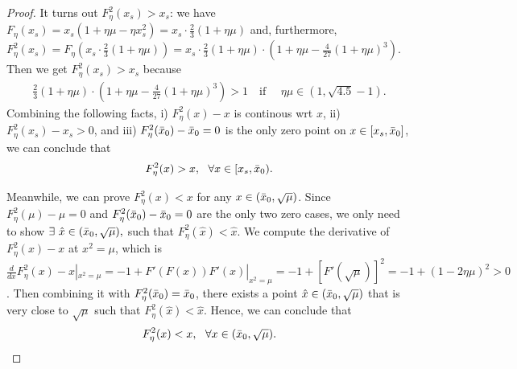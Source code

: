 \documentclass{article}
\theoremstyle{plain}
\theoremstyle{remark}
\begin{document}
\begin{proof}
It turns out $F_{\eta}^2(x_s)>x_s$: we have $F_{\eta}(x_s)=x_s(1+\eta\mu-\eta x_s^2) = x_s\cdot \frac{2}{3}(1+\eta\mu)$ and, furthermore, $F^2_\eta(x_s)=F_\eta(x_s\cdot \frac{2}{3}(1+\eta\mu))=x_s\cdot \frac{2}{3}(1+\eta\mu)\cdot\left(1+\eta\mu-\frac{4}{27}(1+\eta\mu)^3\right)$. Then we get $F^2_\eta(x_s)>x_s$ because
\begin{align}
    \frac{2}{3}(1+\eta\mu)\cdot\left(1+\eta\mu-\frac{4}{27}(1+\eta\mu)^3\right) > 1 \text{~~~if~~~~} \eta\mu\in(1,\sqrt{4.5}-1).
\end{align}
Combining the following facts, i) $F^2_\eta(x)-x$ is continous wrt $x$, ii) $F^2_\eta(x_s)-x_s>0$, and iii) $F^2_\eta(\Bar{x}_0)-\Bar{x}_0=0$ is the only zero point on $x\in[x_s, \Bar{x}_0]$, we can conclude that 
\begin{align}
    F^2_\eta(x)>x, ~~\forall x \in[x_s,\Bar{x}_0).
\end{align}

Meanwhile, we can prove $F^2_\eta(x)<x$ for any $x\in(\Bar{x}_0,\sqrt{\mu})$. Since $F^2_\eta(\mu)-\mu=0$ and $F^2_\eta(\Bar{x}_0)-\Bar{x}_0=0$ are the only two zero cases, we only need to show $\exists ~\hat{x}\in (\Bar{x}_0,\sqrt{\mu}),$ such that $F^2_\eta(\hat{x})<\hat{x}$. We compute the derivative of $F^2_\eta(x)-x$ at $x^2=\mu$, which is $\frac{d}{dx}F^2_\eta(x)-x|_{x^2=\mu}=-1+F'(F(x))F'(x)|_{x^2=\mu}=-1+[F'(\sqrt{\mu})]^2=-1+(1-2\eta\mu)^2>0$. Then combining it with $F^2_\eta(\Bar{x}_0)=\Bar{x}_0$, there exists a point $\hat{x}\in(\Bar{x}_0,\sqrt{\mu})$ that is very close to $\sqrt{\mu}$ such that $F^2_\eta(\hat{x})<\hat{x}$. Hence, we can conclude that 
\begin{align}
    F^2_\eta(x)<x, ~~\forall x \in(\Bar{x}_0,\sqrt{\mu}).
\end{align}




\end{proof}
\end{document}

